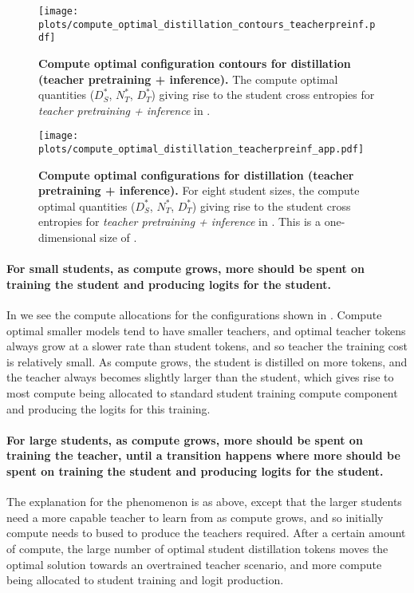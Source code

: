 \begin{figure}[h]
	\centering
	\texttt{[image: plots/compute\_optimal\_distillation\_contours\_teacherpreinf.pdf]}
	\caption{\textbf{Compute optimal configuration contours for distillation (teacher pretraining + inference).} The compute optimal quantities ($D_S^*$, $N_T^*$, $D_T^*$) giving rise to the student cross entropies for \emph{teacher pretraining + inference} in .
	}
	\label{fig:compute-optimal-contours-teacherpreinf-app}
\end{figure}

\begin{figure}[h]
	\centering
	\texttt{[image: plots/compute\_optimal\_distillation\_teacherpreinf\_app.pdf]}
	\caption{\textbf{Compute optimal configurations for distillation (teacher pretraining + inference).} For eight student sizes, the compute optimal quantities ($D_S^*$, $N_T^*$, $D_T^*$) giving rise to the student cross entropies for \emph{teacher pretraining + inference} in . This is a one-dimensional size of .
	}
	\label{fig:compute-optimal-distillation-teacherpreinf-app}
\end{figure}

\paragraph{For small students, as compute grows, more should be spent on training the student and producing logits for the student.}
In  we see the compute allocations for the configurations shown in 
.
Compute optimal smaller models tend to have smaller teachers, 
and optimal teacher tokens always grow at a slower rate than student tokens,
and so teacher the training cost is relatively small.
As compute grows, the student is distilled on more tokens,
and the teacher always becomes slightly larger than the student,
which gives rise to most compute being allocated to standard student training compute component and producing the logits for this training.

\paragraph{For large students, as compute grows, more should be spent on training the teacher, until a transition happens where more should be spent on training the student and producing logits for the student.}
The explanation for the phenomenon is as above, except that the larger students need a more capable teacher to learn from as compute grows, and so initially compute needs to bused to produce the teachers required.
After a certain amount of compute, the large number of optimal student distillation tokens moves the optimal solution towards an overtrained teacher scenario, and more compute being allocated to student training and logit production.

